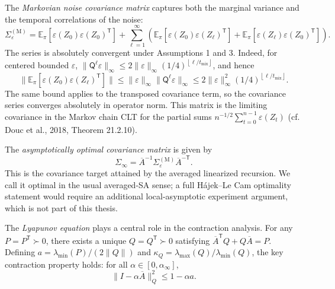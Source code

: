 
The \emph{Markovian noise covariance matrix} captures both the marginal variance and the temporal correlations of the noise:
\begin{equation}
\Sigma_{\varepsilon}^{(\mathrm{M})}
  = \mathbb{E}_{\pi} [\varepsilon(Z_{0}) \varepsilon(Z_{0})^{\mathsf{T}}]
    + \sum_{\ell=1}^{\infty} \left( \mathbb{E}_{\pi} [\varepsilon(Z_{0}) \varepsilon(Z_{\ell})^{\mathsf{T}}]
        + \mathbb{E}_{\pi} [\varepsilon(Z_{\ell}) \varepsilon(Z_{0})^{\mathsf{T}}] \right).
\label{eq:noise-cov}
\end{equation}
The series is absolutely convergent under Assumptions 1 and 3. Indeed, for
centered bounded $\varepsilon$,
$\lVert \mathsf{Q}^{\ell} \varepsilon \rVert_{\infty} \le
2 \lVert \varepsilon \rVert_{\infty} (1 / 4)^{\left\lfloor \ell / t_{\mathrm{mix}} \right\rfloor}$, and hence
\[
\lVert \mathbb{E}_{\pi} [\varepsilon(Z_{0}) \varepsilon(Z_{\ell})^{\mathsf{T}}] \rVert
  \le \lVert \varepsilon \rVert_{\infty} \lVert \mathsf{Q}^{\ell} \varepsilon \rVert_{\infty}
  \le 2 \lVert \varepsilon \rVert_{\infty}^{2} (1 / 4)^{\left\lfloor \ell / t_{\mathrm{mix}} \right\rfloor}.
\]
The same bound applies to the transposed covariance term, so the covariance
series converges absolutely in operator norm.
This matrix is the limiting covariance in the Markov chain CLT for the partial sums $n^{-1/2} \sum_{t=0}^{n-1} \varepsilon(Z_{t})$ (cf. Douc et al., 2018, Theorem 21.2.10).

The \emph{asymptotically optimal covariance matrix} is given by
\begin{equation}
\Sigma_{\infty}
  = \overline{A}^{-1} \Sigma_{\varepsilon}^{(\mathrm{M})} \overline{A}^{-\mathsf{T}}.
\label{eq:asymp-cov}
\end{equation}
This is the covariance target attained by the averaged linearized recursion. We call it optimal in the usual averaged-SA sense; a full Hájek--Le Cam optimality statement would require an additional local-asymptotic experiment argument, which is not part of this thesis.

The \emph{Lyapunov equation} plays a central role in the contraction analysis. For any $P = P^{\mathsf{T}} \succ 0$, there exists a unique $Q = Q^{\mathsf{T}} \succ 0$ satisfying $\overline{A}^{\mathsf{T}} Q + Q \overline{A} = P$. Defining $a = \lambda_{\min} (P) / (2 \lVert Q \rVert)$ and $\kappa_{Q} = \lambda_{\max} (Q) / \lambda_{\min} (Q)$, the key contraction property holds: for all $\alpha \in [0, \alpha_{\infty}]$,
\begin{equation}
\lVert I - \alpha \overline{A} \rVert_{Q}^{2} \le 1 - \alpha a.
\label{eq:contraction}
\end{equation}

